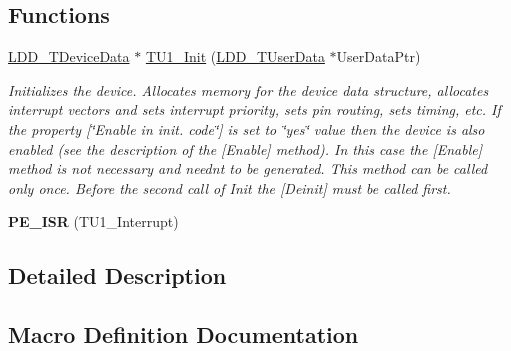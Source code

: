 \subsection*{Functions}
\begin{DoxyCompactItemize}
\item 
\hyperlink{group___p_e___types__module_gac5cf1362f1f0e3a2ce71b1bf2276d091}{L\+D\+D\+\_\+\+T\+Device\+Data} $\ast$ \hyperlink{group___t_u1__module_ga9bfbdf45fe9128c8d9e4245e3480d6da}{T\+U1\+\_\+\+Init} (\hyperlink{group___p_e___types__module_ga0b66a73f87238a782318aa0be7578e35}{L\+D\+D\+\_\+\+T\+User\+Data} $\ast$User\+Data\+Ptr)
\begin{DoxyCompactList}\small\item\em Initializes the device. Allocates memory for the device data structure, allocates interrupt vectors and sets interrupt priority, sets pin routing, sets timing, etc. If the property \mbox{[}\char`\"{}\+Enable in init. code\char`\"{}\mbox{]} is set to \char`\"{}yes\char`\"{} value then the device is also enabled (see the description of the \mbox{[}Enable\mbox{]} method). In this case the \mbox{[}Enable\mbox{]} method is not necessary and needn\textquotesingle{}t to be generated. This method can be called only once. Before the second call of Init the \mbox{[}Deinit\mbox{]} must be called first. \end{DoxyCompactList}\item 
{\bfseries P\+E\+\_\+\+I\+SR} (T\+U1\+\_\+\+Interrupt)\hypertarget{group___t_u1__module_gaa41b92c05e2ee5c591e4960928551eb0}{}\label{group___t_u1__module_gaa41b92c05e2ee5c591e4960928551eb0}

\end{DoxyCompactItemize}


\subsection{Detailed Description}


\subsection{Macro Definition Documentation}
